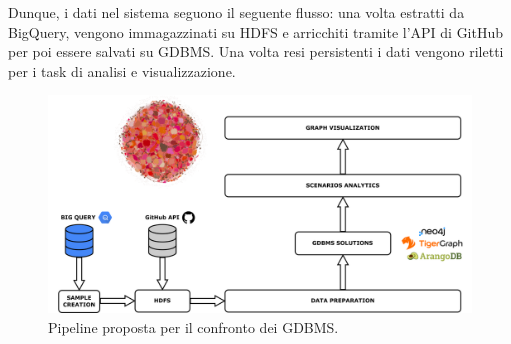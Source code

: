\documentclass[11pt]{article}
\begin{document}
 Dunque, i dati nel sistema seguono il seguente flusso: una volta estratti da BigQuery, vengono immagazzinati su HDFS e arricchiti tramite l'API di GitHub per poi essere salvati su GDBMS. Una volta resi persistenti i dati vengono riletti per i task di analisi e visualizzazione.
\begin{figure}[!ht]
    \centering
    \includegraphics[width=\textwidth]{./images/architettura.png}
    \caption{Pipeline proposta per il confronto dei GDBMS.}
    \label{image:pipeline}
\end{figure}
\end{document}
